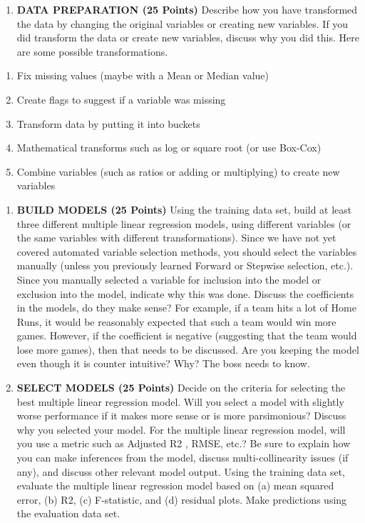 \documentclass[
]{article}
\providecommand{\tightlist}{%
  \setlength{\itemsep}{0pt}\setlength{\parskip}{0pt}}
\begin{document}
\begin{enumerate}
\def\labelenumi{\arabic{enumi}.}
\setcounter{enumi}{1}
\tightlist
\item
  \textbf{DATA PREPARATION (25 Points)} Describe how you have
  transformed the data by changing the original variables or creating
  new variables. If you did transform the data or create new variables,
  discuss why you did this. Here are some possible transformations.
\end{enumerate}

\begin{enumerate}
\def\labelenumi{\alph{enumi}.}
\tightlist
\item
  Fix missing values (maybe with a Mean or Median value)
\item
  Create flags to suggest if a variable was missing
\item
  Transform data by putting it into buckets
\item
  Mathematical transforms such as log or square root (or use Box-Cox)
\item
  Combine variables (such as ratios or adding or multiplying) to create
  new variables
\end{enumerate}

\begin{enumerate}
\def\labelenumi{\arabic{enumi}.}
\setcounter{enumi}{2}
\item
  \textbf{BUILD MODELS (25 Points)} Using the training data set, build
  at least three different multiple linear regression models, using
  different variables (or the same variables with different
  transformations). Since we have not yet covered automated variable
  selection methods, you should select the variables manually (unless
  you previously learned Forward or Stepwise selection, etc.). Since you
  manually selected a variable for inclusion into the model or exclusion
  into the model, indicate why this was done. Discuss the coefficients
  in the models, do they make sense? For example, if a team hits a lot
  of Home Runs, it would be reasonably expected that such a team would
  win more games. However, if the coefficient is negative (suggesting
  that the team would lose more games), then that needs to be discussed.
  Are you keeping the model even though it is counter intuitive? Why?
  The boss needs to know.
\item
  \textbf{SELECT MODELS (25 Points)} Decide on the criteria for
  selecting the best multiple linear regression model. Will you select a
  model with slightly worse performance if it makes more sense or is
  more parsimonious? Discuss why you selected your model. For the
  multiple linear regression model, will you use a metric such as
  Adjusted R2 , RMSE, etc.? Be sure to explain how you can make
  inferences from the model, discuss multi-collinearity issues (if any),
  and discuss other relevant model output. Using the training data set,
  evaluate the multiple linear regression model based on (a) mean
  squared error, (b) R2, (c) F-statistic, and (d) residual plots. Make
  predictions using the evaluation data set.
\end{enumerate}
\end{document}
